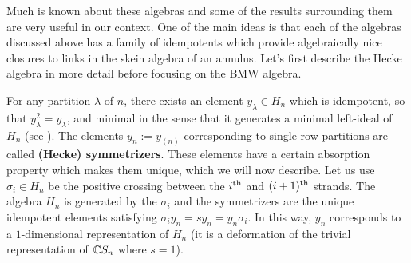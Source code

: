 Much is known about these algebras and some of the results surrounding them are very useful in our context. One of the main ideas is that each of the algebras discussed above has a family of idempotents which provide algebraically nice closures to links in the skein algebra of an annulus. Let's first describe the Hecke algebra in more detail before focusing on the BMW algebra. 

For any partition $\lambda$ of $n$, there exists an element $y_\lambda \in H_n$ which is idempotent, so that $y_\lambda^2 = y_\lambda$, and minimal in the sense that it generates a minimal left-ideal of $H_n$ (see ). The elements $y_n := y_{(n)}$ corresponding to single row partitions are called \textbf{(Hecke) symmetrizers}. These elements have a certain absorption property which makes them unique, which we will now describe. Let us use $\sigma_i \in H_n$ be the positive crossing between the $i^{\rm{th}}$ and $(i+1)^{\rm{th}}$ strands. 
The algebra $H_n$ is generated by the $\sigma_i$ and the symmetrizers are the unique idempotent elements satisfying $\sigma_i y_n = s y_n = y_n \sigma_i$. In this way, $y_n$ corresponds to a $1$-dimensional representation of $H_n$ (it is a deformation of the trivial representation of $\mathbb{C} S_n$ where $s=1$).


